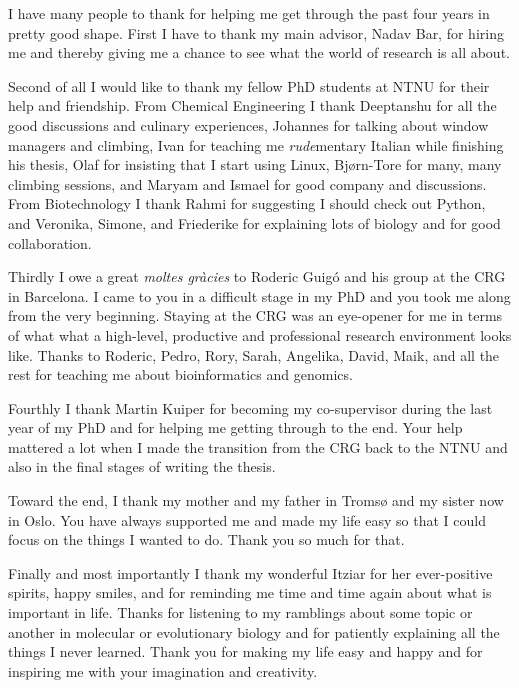 I have many people to thank for helping me get through the past four years in
pretty good shape. First I have to thank my main advisor, Nadav Bar, for hiring
me and thereby giving me a chance to see what the world of research is all
about.

Second of all I would like to thank my fellow PhD students at NTNU for their
help and friendship. From Chemical Engineering I thank Deeptanshu for all the
good discussions and culinary experiences, Johannes for talking about window
managers and climbing, Ivan for teaching me \textit{rude}mentary Italian while
finishing his thesis, Olaf for insisting that I start using Linux, Bjørn-Tore
for many, many climbing sessions, and Maryam and Ismael for good company and
discussions. From Biotechnology I thank Rahmi for suggesting I should check out
Python, and Veronika, Simone, and Friederike for explaining lots of biology and
for good collaboration.

Thirdly I owe a great \textit{moltes gràcies} to Roderic Guigó and his group at
the CRG in Barcelona. I came to you in a difficult stage in my PhD and you took
me along from the very beginning. Staying at the CRG was an eye-opener for me
in terms of what what a high-level, productive and professional research
environment looks like. Thanks to Roderic, Pedro, Rory, Sarah, Angelika, David,
Maik, and all the rest for teaching me about bioinformatics and genomics.

Fourthly I thank Martin Kuiper for becoming my co-supervisor during the last
year of my PhD and for helping me getting through to the end. Your help
mattered a lot when I made the transition from the CRG back to the NTNU and
also in the final stages of writing the thesis.

Toward the end, I thank my mother and my father in Tromsø and my sister now in
Oslo. You have always supported me and made my life easy so that I could focus
on the things I wanted to do. Thank you so much for that.

Finally and most importantly I thank my wonderful Itziar for her ever-positive
spirits, happy smiles, and for reminding me time and time again about what is
important in life. Thanks for listening to my ramblings about some topic or
another in molecular or evolutionary biology and for patiently explaining all
the things I never learned. Thank you for making my life easy and happy and for
inspiring me with your imagination and creativity.
